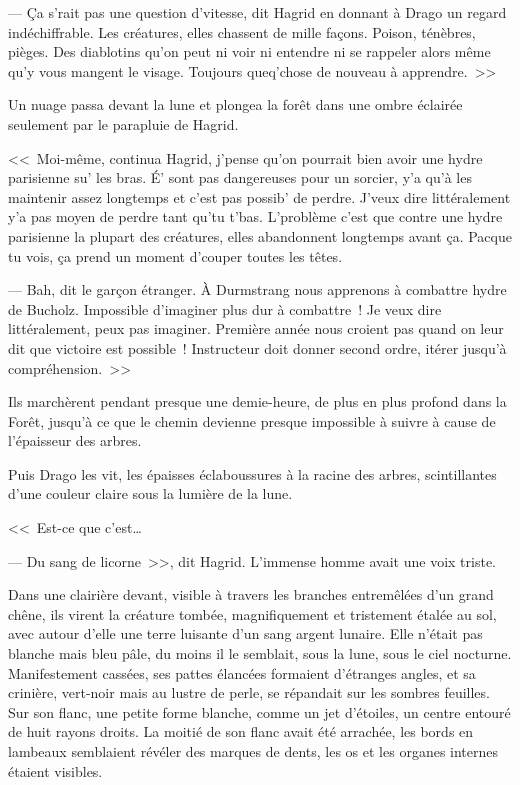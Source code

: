 --- Ça s'rait pas une question d'vitesse, dit Hagrid en donnant à Drago un regard indéchiffrable. Les créatures, elles chassent de mille façons. Poison, ténèbres, pièges. Des diablotins qu'on peut ni voir ni entendre ni se rappeler alors même qu'y vous mangent le visage. Toujours queq'chose de nouveau à apprendre.~>>

Un nuage passa devant la lune et plongea la forêt dans une ombre éclairée seulement par le parapluie de Hagrid.

<<~Moi-même, continua Hagrid, j'pense qu'on pourrait bien avoir une hydre parisienne su' les bras. É' sont pas dangereuses pour un sorcier, y'a qu'à les maintenir assez longtemps et c'est pas possib' de perdre. J'veux dire littéralement y'a pas moyen de perdre tant qu'tu t'bas. L'problème c'est que contre une hydre parisienne la plupart des créatures, elles abandonnent longtemps avant ça. Pacque tu vois, ça prend un moment d'couper toutes les têtes.

--- Bah, dit le garçon étranger. À Durmstrang nous apprenons à combattre hydre de Bucholz. Impossible d'imaginer plus dur à combattre~! Je veux dire littéralement, peux pas imaginer. Première année nous croient pas quand on leur dit que victoire est possible~! Instructeur doit donner second ordre, itérer jusqu'à compréhension.~>>

Ils marchèrent pendant presque une demie-heure, de plus en plus profond dans la Forêt, jusqu'à ce que le chemin devienne presque impossible à suivre à cause de l'épaisseur des arbres.

Puis Drago les vit, les épaisses éclaboussures à la racine des arbres, scintillantes d'une couleur claire sous la lumière de la lune.

<<~Est-ce que c'est…

--- Du sang de licorne~>>, dit Hagrid. L'immense homme avait une voix triste.

Dans une clairière devant, visible à travers les branches entremêlées d'un grand chêne, ils virent la créature tombée, magnifiquement et tristement étalée au sol, avec autour d'elle une terre luisante d'un sang argent lunaire. Elle n'était pas blanche mais bleu pâle, du moins il le semblait, sous la lune, sous le ciel nocturne. Manifestement cassées, ses pattes élancées formaient d'étranges angles, et sa crinière, vert-noir mais au lustre de perle, se répandait sur les sombres feuilles. Sur son flanc, une petite forme blanche, comme un jet d'étoiles, un centre entouré de huit rayons droits. La moitié de son flanc avait été arrachée, les bords en lambeaux semblaient révéler des marques de dents, les os et les organes internes étaient visibles.

